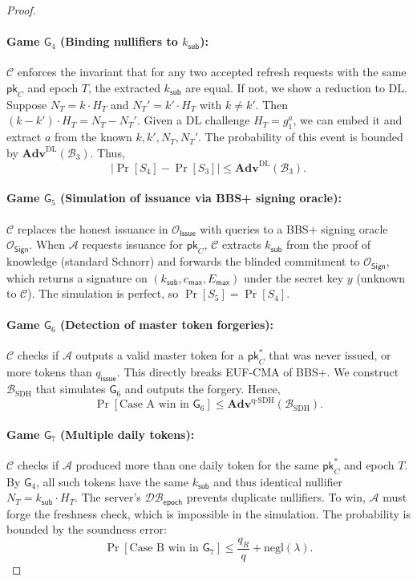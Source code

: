 \documentclass[11pt]{article}
\theoremstyle{definitionstyle}
\theoremstyle{plain}
\newcommand{\advantage}[1]{\mathbf{Adv}^{\mathrm{#1}}}
\newcommand{\negl}{\mathrm{negl}}
\newcommand{\DB}{\mathcal{DB}}
\begin{document}
\begin{proof}
\paragraph{Game $\mathsf{G}_4$ (Binding nullifiers to $k_{\mathsf{sub}}$):} $\mathcal{C}$ enforces the invariant that for any two accepted refresh requests with the same $\mathsf{pk}_C$ and epoch $T$, the extracted $k_{\mathsf{sub}}$ are equal. If not, we show a reduction to DL. Suppose $N_T = k \cdot H_T$ and $N_T' = k' \cdot H_T$ with $k \neq k'$. Then $(k - k') \cdot H_T = N_T - N_T'$. Given a DL challenge $H_T = g_1^a$, we can embed it and extract $a$ from the known $k,k',N_T,N_T'$. The probability of this event is bounded by $\advantage{DL}(\mathcal{B}_3)$. Thus,
\[
|\Pr[S_4] - \Pr[S_3]| \le \advantage{DL}(\mathcal{B}_3).
\]

\paragraph{Game $\mathsf{G}_5$ (Simulation of issuance via BBS+ signing oracle):} $\mathcal{C}$ replaces the honest issuance in $\mathcal{O}_{\mathsf{Issue}}$ with queries to a BBS+ signing oracle $\mathcal{O}_{\mathsf{Sign}}$. When $\mathcal{A}$ requests issuance for $\mathsf{pk}_C$, $\mathcal{C}$ extracts $k_{\mathsf{sub}}$ from the proof of knowledge (standard Schnorr) and forwards the blinded commitment to $\mathcal{O}_{\mathsf{Sign}}$, which returns a signature on $(k_{\mathsf{sub}}, c_{\mathsf{max}}, E_{\mathsf{max}})$ under the secret key $y$ (unknown to $\mathcal{C}$). The simulation is perfect, so $\Pr[S_5] = \Pr[S_4]$.

\paragraph{Game $\mathsf{G}_6$ (Detection of master token forgeries):} $\mathcal{C}$ checks if $\mathcal{A}$ outputs a valid master token for a $\mathsf{pk}_C^*$ that was never issued, or more tokens than $q_{\mathsf{issue}}$. This directly breaks EUF-CMA of BBS+. We construct $\mathcal{B}_{\text{SDH}}$ that simulates $\mathsf{G}_6$ and outputs the forgery. Hence,
\[
\Pr[\text{Case A win in }\mathsf{G}_6] \le \advantage{q\text{-}SDH}(\mathcal{B}_{\text{SDH}}).
\]

\paragraph{Game $\mathsf{G}_7$ (Multiple daily tokens):} $\mathcal{C}$ checks if $\mathcal{A}$ produced more than one daily token for the same $\mathsf{pk}_C^*$ and epoch $T$. By $\mathsf{G}_4$, all such tokens have the same $k_{\mathsf{sub}}$ and thus identical nullifier $N_T = k_{\mathsf{sub}} \cdot H_T$. The server's $\DB_{\mathsf{epoch}}$ prevents duplicate nullifiers. To win, $\mathcal{A}$ must forge the freshness check, which is impossible in the simulation. The probability is bounded by the soundness error:
\[
\Pr[\text{Case B win in }\mathsf{G}_7] \le \frac{q_R}{q} + \negl(\lambda).
\]


\end{proof}
\end{document}
